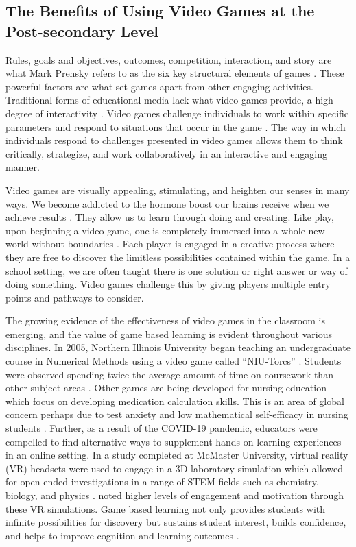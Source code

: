 \documentclass{article}
\begin{document}
\subsection{The Benefits of Using Video Games at the Post-secondary Level}

 Rules, goals and objectives, outcomes, competition, interaction, and story are what Mark Prensky refers to as the six key structural elements of games \citep{prensky2001fun}. These powerful factors are what set games apart from other engaging activities. Traditional forms of educational media lack what video games provide, a high degree of interactivity \citep{coller2009effectiveness}. Video games challenge individuals to work within specific parameters and respond to situations that occur in the game \citep{coller2009effectiveness}. The way in which individuals respond to challenges presented in video games allows them to think critically, strategize, and work collaboratively in an interactive and engaging manner.

Video games are visually appealing, stimulating, and heighten our senses in many ways. We become addicted to the hormone boost our brains receive when we achieve results \citep{tomavska2022let}. They allow us to learn through doing and creating. Like play, upon beginning a video game, one is completely immersed into a whole new world without boundaries \citep{coller2009effectiveness}. Each player is engaged in a creative process where they are free to discover the limitless possibilities contained within the game. In a school setting, we are often taught there is one solution or right answer or way of doing something. Video games challenge this by giving players multiple entry points and pathways to consider.

The growing evidence of the effectiveness of video games in the classroom is emerging, and the value of game based learning is evident throughout various disciplines. In 2005, Northern Illinois University began teaching an undergraduate course in Numerical Methods using a video game called “NIU-Torcs” \citep{coller2009effectiveness}. Students were observed spending twice the average amount of time on coursework than other subject areas \citep{coller2009effectiveness}. Other games are being developed for nursing education which focus on developing medication calculation skills. This is an area of global concern perhaps due to test anxiety and low mathematical self-efficacy in nursing students \citep{foss2013medication}. Further, as a result of the COVID-19 pandemic, educators were compelled to find alternative ways to supplement hands-on learning experiences in an online setting. In a study completed at McMaster University, virtual reality (VR) headsets were used to engage in a 3D laboratory simulation which allowed for open-ended investigations in a range of STEM fields such as chemistry, biology, and physics \citep{tsirulnikov2023game}. \citet{tsirulnikov2023game} noted higher levels of engagement and motivation through these VR simulations. Game based learning not only provides students with infinite possibilities for discovery but sustains student interest, builds confidence, and helps to improve cognition and learning outcomes \citep{divjak2011impact}.
\end{document}
